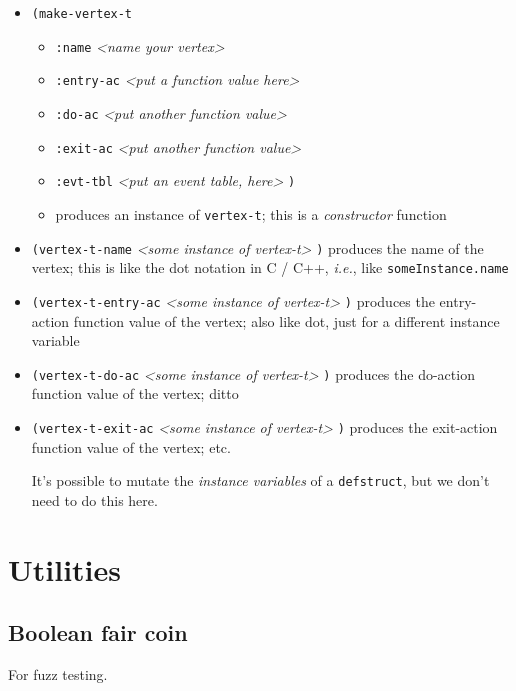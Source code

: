 \documentclass[10pt,oneside,x11names]{article}
\begin{document}
\begin{itemize}
\item \texttt{(make-vertex-t}
\begin{itemize}
\item \texttt{:name} \emph{<name your vertex>}
\item \texttt{:entry-ac} \emph{<put a function value here>}
\item \texttt{:do-ac} \emph{<put another function value>}
\item \texttt{:exit-ac} \emph{<put another function value>}
\item \texttt{:evt-tbl} \emph{<put an event table, here>} \texttt{)}
\item produces an instance of \texttt{vertex-t}; this is a \emph{constructor} function
\end{itemize}

\item \texttt{(vertex-t-name} \emph{<some instance of vertex-t>} \texttt{)} produces the name of the
vertex; this is like the dot notation in C / C++, \emph{i.e.}, like \texttt{someInstance.name}

\item \texttt{(vertex-t-entry-ac} \emph{<some instance of vertex-t>} \texttt{)} produces the
entry-action function value of the vertex; also like dot, just for a
different instance variable

\item \texttt{(vertex-t-do-ac} \emph{<some instance of vertex-t>} \texttt{)} produces the
do-action function value of the vertex; ditto

\item \texttt{(vertex-t-exit-ac} \emph{<some instance of vertex-t>} \texttt{)} produces the
exit-action function value of the vertex; etc.

It's possible to mutate the \emph{instance variables} of a \texttt{defstruct}, but we
don't need to do this here.
\end{itemize}

\section{Utilities}
\label{sec:org40272ed}

\subsection{Boolean fair coin}
\label{sec:orgee32da8}

For fuzz testing.
\end{document}

